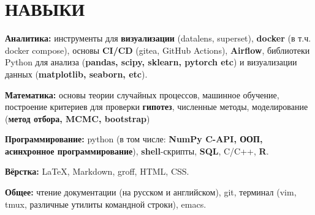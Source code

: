 \section{НАВЫКИ}

\begin{description}
  \setlength\itemsep{-0.4em}
  
\item{\bfseries Аналитика:} инструменты для \textbf{визуализации}
  (datalens, superset), \textbf{docker} (в т.ч. docker compose),
  основы \textbf{CI/CD} (gitea, GitHub Actions), \textbf{Airflow},
  библиотеки Python для анализа (\textbf{pandas, scipy, sklearn,
    pytorch etc}) и визуализации данных (\textbf{matplotlib, seaborn,
    etc}).
  
\item{\bfseries Математика:} основы теории случайных процессов,
  машинное обучение, построение критериев для проверки
  \textbf{гипотез}, численные методы, моделирование (\textbf{метод
    отбора, MCMC, bootstrap})
  
\item{\bfseries Программирование:} python (в том числе: \textbf{NumPy
    C-API, ООП, асинхронное программирование}),
  \textbf{shell}-скрипты, \textbf{SQL}, C/C++, \textbf{R}.
  
\item{\bfseries Вёрстка:} \LaTeX, Markdown, groff, HTML, CSS.
  
\item{\bfseries Общее:} чтение документации (на русском и английском),
  git, терминал (vim, tmux, различные утилиты командной строки), emacs.
\end{description}
